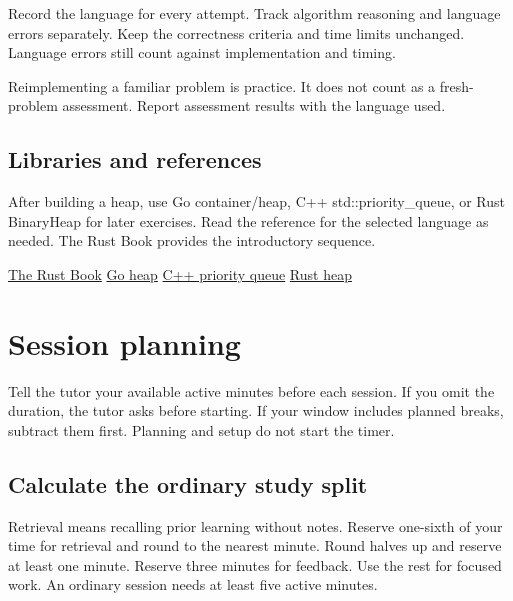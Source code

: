 \documentclass[11pt,letterpaper]{article}
\begin{document}
Record the language for every attempt. Track algorithm reasoning and language errors separately. Keep the correctness criteria and time limits unchanged. Language errors still count against implementation and timing.

Reimplementing a familiar problem is practice. It does not count as a fresh-problem assessment. Report assessment results with the language used.

\subsection*{Libraries and references}

After building a heap, use Go container/heap, C++ std::priority\_queue, or Rust BinaryHeap for later exercises. Read the reference for the selected language as needed. The Rust Book provides the introductory sequence.

\href{https://doc.rust-lang.org/book/}{The Rust Book} \href{https://pkg.go.dev/container/heap}{Go heap} \href{https://eel.is/c++draft/priority.queue}{C++ priority queue} \href{https://doc.rust-lang.org/std/collections/struct.BinaryHeap.html}{Rust heap}

\section{Session planning}\label{sec:25}

Tell the tutor your available active minutes before each session. If you omit the duration, the tutor asks before starting. If your window includes planned breaks, subtract them first. Planning and setup do not start the timer.

\subsection*{Calculate the ordinary study split}

Retrieval means recalling prior learning without notes. Reserve one-sixth of your time for retrieval and round to the nearest minute. Round halves up and reserve at least one minute. Reserve three minutes for feedback. Use the rest for focused work. An ordinary session needs at least five active minutes.
\end{document}
